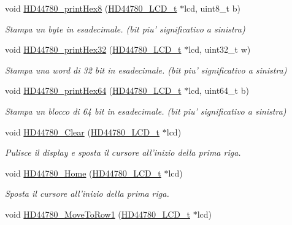 \begin{DoxyCompactItemize}
void \hyperlink{group___h_d44780_gad967bd458b4d2bd358a93cbb7144addd}{H\+D44780\+\_\+print\+Hex8} (\hyperlink{struct_h_d44780___l_c_d__t}{H\+D44780\+\_\+\+L\+C\+D\+\_\+t} $\ast$lcd, uint8\+\_\+t b)
\begin{DoxyCompactList}\small\item\em Stampa un byte in esadecimale. (bit piu' significativo a sinistra) \end{DoxyCompactList}\item 
void \hyperlink{group___h_d44780_gaa82a2a27a3008f55c969a2d390c50497}{H\+D44780\+\_\+print\+Hex32} (\hyperlink{struct_h_d44780___l_c_d__t}{H\+D44780\+\_\+\+L\+C\+D\+\_\+t} $\ast$lcd, uint32\+\_\+t w)
\begin{DoxyCompactList}\small\item\em Stampa una word di 32 bit in esadecimale. (bit piu' significativo a sinistra) \end{DoxyCompactList}\item 
void \hyperlink{group___h_d44780_ga7a4b110e7da806f8c01e01d184d3a19a}{H\+D44780\+\_\+print\+Hex64} (\hyperlink{struct_h_d44780___l_c_d__t}{H\+D44780\+\_\+\+L\+C\+D\+\_\+t} $\ast$lcd, uint64\+\_\+t b)
\begin{DoxyCompactList}\small\item\em Stampa un blocco di 64 bit in esadecimale. (bit piu' significativo a sinistra) \end{DoxyCompactList}\item 
void \hyperlink{group___h_d44780_ga38cac13d7a66f068be54f79a716ff7d4}{H\+D44780\+\_\+\+Clear} (\hyperlink{struct_h_d44780___l_c_d__t}{H\+D44780\+\_\+\+L\+C\+D\+\_\+t} $\ast$lcd)
\begin{DoxyCompactList}\small\item\em Pulisce il display e sposta il cursore all'inizio della prima riga. \end{DoxyCompactList}\item 
void \hyperlink{group___h_d44780_ga68e3712332aa9482d4bdaa4991a92127}{H\+D44780\+\_\+\+Home} (\hyperlink{struct_h_d44780___l_c_d__t}{H\+D44780\+\_\+\+L\+C\+D\+\_\+t} $\ast$lcd)
\begin{DoxyCompactList}\small\item\em Sposta il cursore all'inizio della prima riga. \end{DoxyCompactList}\item 
void \hyperlink{group___h_d44780_gad90e2924a4e632ce42940323f8f49e37}{H\+D44780\+\_\+\+Move\+To\+Row1} (\hyperlink{struct_h_d44780___l_c_d__t}{H\+D44780\+\_\+\+L\+C\+D\+\_\+t} $\ast$lcd)

\end{DoxyCompactItemize}
